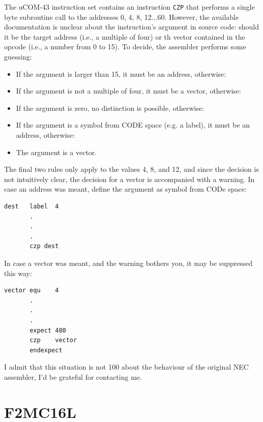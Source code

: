 \documentclass[12pt,twoside]{report}
\begin{document}
The uCOM-43 instruction set contains an instruction {\tt CZP} that performs a
single byte subroutine call to the addresses 0, 4, 8, 12...60.  However, the
available documentation is unclear about the instruction's argument in source
code: should it be the target address (i.e., a multiple of four) or th vector
contained in the opcode (i.e., a number from 0 to 15).  To decide, the assembler
performs some guessing:
\begin{itemize}
\item{If the argument is larger than 15, it must be an address, otherwise:}
\item{If the argument is not a multiple of four, it must be a vector, otherwise:}
\item{If the argument is zero, no distinction is possible, otherwise:}
\item{If the argument is a symbol from CODE space (e.g. a label), it must
      be an address, otherwise:}
\item{The argument is a vector.}
\end{itemize}
The final two rules only apply to the values 4, 8, and 12, and since the
decision is not intuitively clear, the decision for a vector is accompanied
with a warning.  In case an address was meant, define the argument as symbol
from CODe space:
\begin{verbatim}
dest   label  4
       .
       .
       .
       czp dest
\end{verbatim}
In case a vector was meant, and the warning bothers you, it may be suppressed
this way:
\begin{verbatim}
vector equ    4
       .
       .
       .
       expect 480
       czp    vector
       endexpect
\end{verbatim}
I admit that this situation is not 100%
about the behaviour of the original NEC assembler, I'd be grateful for contacting
me.


\section{F2MC16L}
\end{document}

